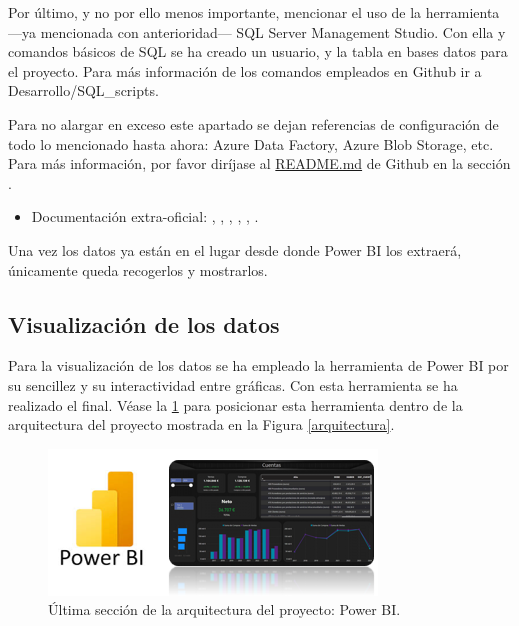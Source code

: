 Por último, y no por ello menos importante, mencionar el uso de la herramienta ---ya mencionada con anterioridad--- SQL Server Management Studio. Con ella y comandos básicos de SQL se ha creado un usuario, y la tabla en bases datos para el proyecto. Para más información de los comandos empleados en Github ir a Desarrollo/SQL\_scripts.

\begin{nota}
    Para no alargar en exceso este apartado  se dejan referencias de configuración de todo lo mencionado hasta ahora: Azure Data Factory, Azure Blob Storage, etc. Para más información, por favor diríjase al \href{https://github.com/JCOQUE/TFG-ingenieria/blob/main/README.md}{README.md} de Github en la sección .
    \begin{itemize}
        \item Documentación extra-oficial: \parencite{azure1}, \parencite{azure2}, \parencite{azure3}, \parencite{azure4}, \parencite{azure5}, \parencite{azure6}.
    \end{itemize}
\end{nota}

Una vez los  datos ya están en el lugar desde donde Power BI los extraerá, únicamente queda recogerlos y mostrarlos.

\subsection{Visualización de los datos}
Para la visualización de los datos se  ha empleado la herramienta de Power BI por su sencillez y su interactividad entre gráficas. Con esta herramienta se ha realizado el  final. Véase la \ref{PowerBI} para posicionar esta  herramienta dentro de la arquitectura del proyecto mostrada en la Figura \ref{arquitectura}.

\begin{figure}[H]
    \centering
    \includegraphics{imgs/powerBI.png}
    \caption{Última sección de la arquitectura del proyecto: Power BI.}
    \label{PowerBI}
\end{figure}

